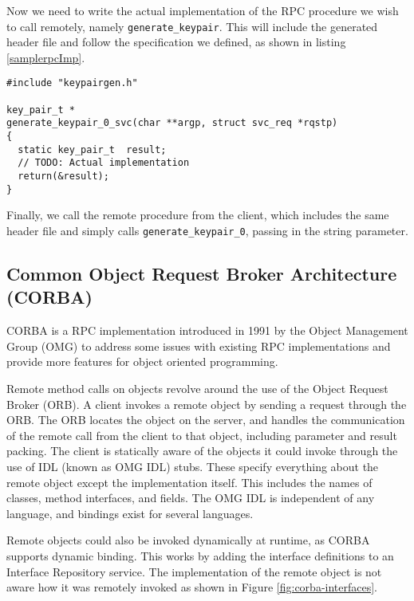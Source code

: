 Now we need to write the actual implementation of the RPC procedure we wish to call remotely, namely \lstinline+generate_keypair+. This will include the generated header file and follow the specification we defined, as shown in listing \ref{samplerpcImp}. \\


\begin{lstlisting}
#include "keypairgen.h"

key_pair_t *
generate_keypair_0_svc(char **argp, struct svc_req *rqstp)
{
  static key_pair_t  result;
  // TODO: Actual implementation
  return(&result);
}
\end{lstlisting}

Finally, we call the remote procedure from the client, which includes the same header file and simply calls \lstinline+generate_keypair_0+, passing in the string parameter.

\subsection{Common Object Request Broker Architecture (CORBA)}
CORBA is a RPC implementation introduced in 1991 by the Object Management Group (OMG) to address some issues with existing RPC implementations and provide more features for object oriented programming.

Remote method calls on objects revolve around the use of the Object Request Broker (ORB)\cite{isocorba}. A client invokes a remote object by sending a request through the ORB. The ORB locates the object on the server, and handles the communication of the remote call from the client to that object, including parameter and result packing. The client is statically aware of the objects it could invoke through the use of IDL (known as OMG IDL) stubs. These specify everything about the remote object except the implementation itself. This includes the names of classes, method interfaces, and fields. The OMG IDL is independent of any language, and bindings exist for several languages. 

Remote objects could also be invoked dynamically at runtime, as CORBA supports dynamic binding. This works by adding the interface definitions to an Interface Repository service. The implementation of the remote object is not aware how it was remotely invoked as shown in Figure \ref{fig:corba-interfaces}.

